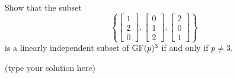 
\begin{ProbBox} %
\begin{problem}[Golan 177]
Show that the subset
\[
\left\{ 
\begin{bmatrix}
  1\\[0.3em] 2\\[0.3em] 0
\end{bmatrix},
\begin{bmatrix}
  0\\[0.3em] 1\\[0.3em] 2
\end{bmatrix},
\begin{bmatrix}
  2\\[0.3em] 0\\[0.3em] 1
\end{bmatrix}
\right\}
\]
is a linearly independent subset of $\operatorname{GF}(p)^3$ if and only if $p\neq 3$.
\end{problem}
\smallskip
\begin{solution}
(type your solution here)
\end{solution}
\end{ProbBox}
\probskip

